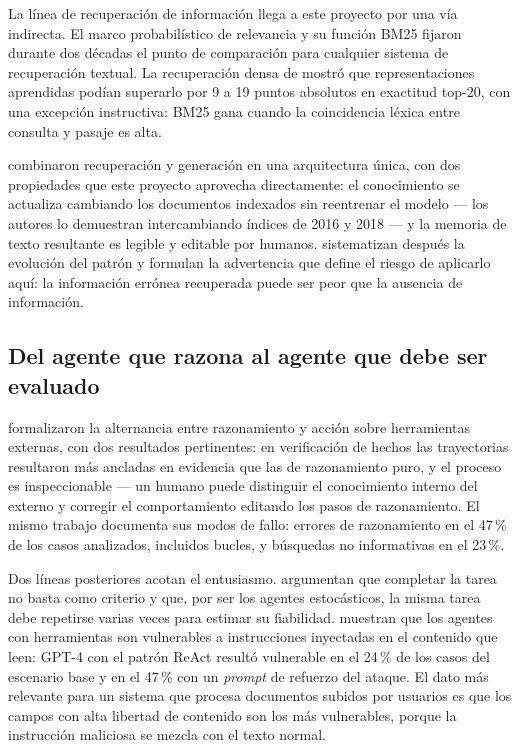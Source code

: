La línea de recuperación de información llega a este proyecto por una vía indirecta.
El marco probabilístico de relevancia y su función BM25 \parencite{robertson2009probabilistic}
fijaron durante dos décadas el punto de comparación para cualquier sistema de
recuperación textual. La recuperación densa de \textcite{karpukhin2020dense} mostró
que representaciones aprendidas podían superarlo por 9 a 19 puntos absolutos en
exactitud top-20, con una excepción instructiva: BM25 gana cuando la coincidencia
léxica entre consulta y pasaje es alta.

\textcite{lewis2020retrieval} combinaron recuperación y generación en una arquitectura
única, con dos propiedades que este proyecto aprovecha directamente: el conocimiento
se actualiza cambiando los documentos indexados sin reentrenar el modelo --- los
autores lo demuestran intercambiando índices de 2016 y 2018 --- y la memoria de texto
resultante es legible y editable por humanos. \textcite{gao2024retrieval} sistematizan
después la evolución del patrón y formulan la advertencia que define el riesgo de
aplicarlo aquí: la información errónea recuperada puede ser peor que la ausencia de
información.

\subsection{Del agente que razona al agente que debe ser evaluado}
\label{sec:ant-agentes}

\textcite{yao2023react} formalizaron la alternancia entre razonamiento y acción sobre
herramientas externas, con dos resultados pertinentes: en verificación de hechos las
trayectorias resultaron más ancladas en evidencia que las de razonamiento puro, y el
proceso es inspeccionable --- un humano puede distinguir el conocimiento interno del
externo y corregir el comportamiento editando los pasos de razonamiento. El mismo
trabajo documenta sus modos de fallo: errores de razonamiento en el 47\,\% de los
casos analizados, incluidos bucles, y búsquedas no informativas en el 23\,\%.

Dos líneas posteriores acotan el entusiasmo. \textcite{mohammadi2025evaluation}
argumentan que completar la tarea no basta como criterio y que, por ser los agentes
estocásticos, la misma tarea debe repetirse varias veces para estimar su fiabilidad.
\textcite{zhan2024injecagent} muestran que los agentes con herramientas son
vulnerables a instrucciones inyectadas en el contenido que leen: GPT-4 con el patrón
ReAct resultó vulnerable en el 24\,\% de los casos del escenario base y en el 47\,\%
con un \emph{prompt} de refuerzo del ataque. El dato más relevante para un sistema que
procesa documentos subidos por usuarios es que los campos con alta libertad de
contenido son los más vulnerables, porque la instrucción maliciosa se mezcla con el
texto normal.


